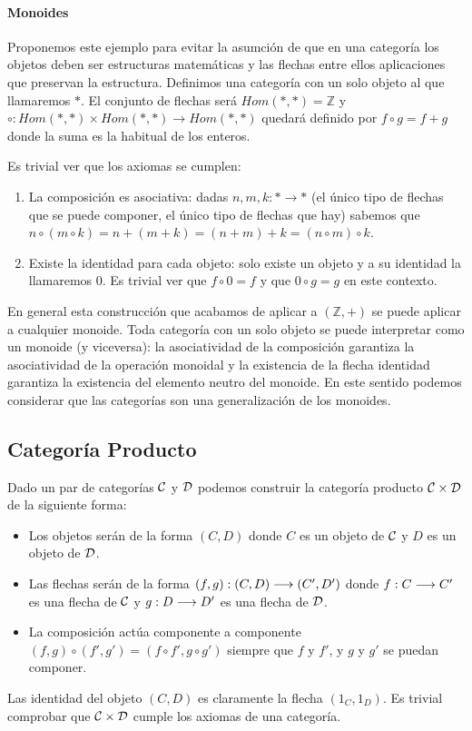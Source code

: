 \paragraph{Monoides}
Proponemos este ejemplo para evitar la asumción de que en una categoría
los objetos deben ser estructuras matemáticas y las flechas entre ellos
aplicaciones que preservan la estructura. Definimos una categoría
con un solo objeto al que llamaremos $*$. El conjunto de flechas
será $Hom(*, *) = \mathbb{Z}$ y
$\circ : Hom(*, *)\times Hom(*, *)\rightarrow Hom(*, *)$ quedará definido
por $f \circ g = f + g$ donde la suma es la habitual de los enteros.

Es trivial ver que los axiomas se cumplen:
\begin{enumerate}
\item La composición es asociativa: dadas $n, m, k : * \longrightarrow *$
(el único tipo de flechas que se puede componer, el único tipo de
flechas que hay) sabemos que
$n \circ (m \circ k) = n + (m + k) = (n + m) + k = (n \circ m) \circ k$.

\item Existe la identidad para cada objeto: solo existe un objeto y a su
identidad la llamaremos 0. Es trivial ver que $f \circ 0 = f$ y que
$0 \circ g = g$ en este contexto.
\end{enumerate}
En general esta construcción que acabamos de aplicar a $(\mathbb{Z}, +)$
se puede aplicar a cualquier monoide. Toda categoría con un solo
objeto se puede interpretar como un monoide (y viceversa):
la asociatividad de la
composición garantiza la asociatividad de la operación monoidal y
la existencia de la flecha identidad garantiza la existencia del
elemento neutro del monoide. En este sentido podemos considerar que
las categorías son una generalización de los monoides.

\subsection{Categoría Producto}
Dado un par de categorías $\mathcal{C}$ y $\mathcal{D}$ podemos construir la categoría
producto $\mathcal{C}\times\mathcal{D}$ de la siguiente forma:
\begin{itemize}
\item Los objetos serán de la forma $(C, D)$ donde $C$ es un objeto
  de $\mathcal{C}$ y $D$ es un objeto de $\mathcal{D}$.
\item Las flechas serán de la forma $(f, g) : (C, D)\longrightarrow (C', D')$
  donde $f: C\longrightarrow C'$ es una flecha de $\mathcal{C}$ y $g : D\longrightarrow D'$
  es una flecha de $\mathcal{D}$.
\item La composición actúa componente a componente
  $(f, g) \circ (f', g') = (f \circ f', g \circ g')$ siempre
  que $f$ y $f'$, y $g$ y $g'$ se puedan componer.
\end{itemize}

Las identidad del objeto $(C, D)$ es claramente la flecha
$(1_C, 1_D)$. Es trivial comprobar que $\mathcal{C}\times\mathcal{D}$ cumple
los axiomas de una categoría.
